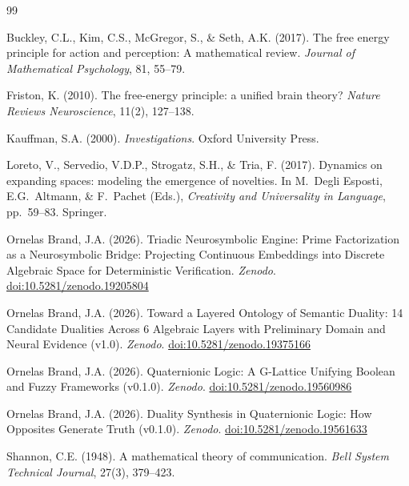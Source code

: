 \documentclass[11pt,a4paper]{article}
\begin{document}
\begin{thebibliography}{99}

Buckley, C.L., Kim, C.S., McGregor, S., \& Seth, A.K. (2017).
The free energy principle for action and perception: A mathematical review.
\textit{Journal of Mathematical Psychology}, 81, 55--79.

Friston, K. (2010).
The free-energy principle: a unified brain theory?
\textit{Nature Reviews Neuroscience}, 11(2), 127--138.

Kauffman, S.A. (2000).
\textit{Investigations}.
Oxford University Press.

Loreto, V., Servedio, V.D.P., Strogatz, S.H., \& Tria, F. (2017).
Dynamics on expanding spaces: modeling the emergence of novelties.
In M.\ Degli Esposti, E.G.\ Altmann, \& F.\ Pachet (Eds.),
\textit{Creativity and Universality in Language}, pp.\ 59--83.
Springer.

Ornelas Brand, J.A. (2026).
Triadic Neurosymbolic Engine: Prime Factorization as a Neurosymbolic
Bridge: Projecting Continuous Embeddings into Discrete Algebraic Space
for Deterministic Verification.
\textit{Zenodo}.
\href{https://doi.org/10.5281/zenodo.19205804}{doi:10.5281/zenodo.19205804}

Ornelas Brand, J.A. (2026).
Toward a Layered Ontology of Semantic Duality: 14 Candidate Dualities
Across 6 Algebraic Layers with Preliminary Domain and Neural Evidence
(v1.0).
\textit{Zenodo}.
\href{https://doi.org/10.5281/zenodo.19375166}{doi:10.5281/zenodo.19375166}

Ornelas Brand, J.A. (2026).
Quaternionic Logic: A G-Lattice Unifying Boolean and Fuzzy Frameworks (v0.1.0).
\textit{Zenodo}.
\href{https://doi.org/10.5281/zenodo.19560986}{doi:10.5281/zenodo.19560986}

Ornelas Brand, J.A. (2026).
Duality Synthesis in Quaternionic Logic: How Opposites Generate Truth (v0.1.0).
\textit{Zenodo}.
\href{https://doi.org/10.5281/zenodo.19561633}{doi:10.5281/zenodo.19561633}

Shannon, C.E. (1948).
A mathematical theory of communication.
\textit{Bell System Technical Journal}, 27(3), 379--423.

\end{thebibliography}
\end{document}
